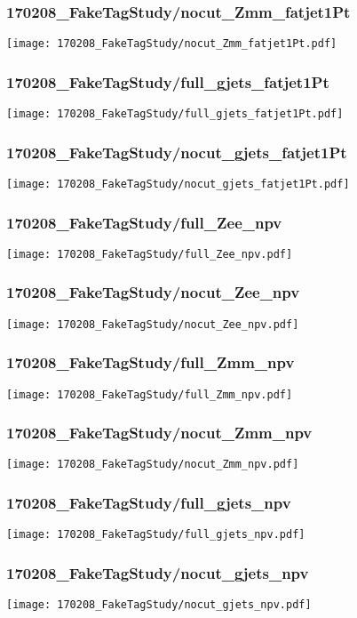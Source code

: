 \begin{frame}
   \frametitle{\small 170208\_FakeTagStudy/nocut\_Zmm\_fatjet1Pt}
   \centering
   \texttt{[image: 170208\_FakeTagStudy/nocut\_Zmm\_fatjet1Pt.pdf]}
\end{frame}

\begin{frame}
   \frametitle{\small 170208\_FakeTagStudy/full\_gjets\_fatjet1Pt}
   \centering
   \texttt{[image: 170208\_FakeTagStudy/full\_gjets\_fatjet1Pt.pdf]}
\end{frame}

\begin{frame}
   \frametitle{\small 170208\_FakeTagStudy/nocut\_gjets\_fatjet1Pt}
   \centering
   \texttt{[image: 170208\_FakeTagStudy/nocut\_gjets\_fatjet1Pt.pdf]}
\end{frame}

\begin{frame}
   \frametitle{\small 170208\_FakeTagStudy/full\_Zee\_npv}
   \centering
   \texttt{[image: 170208\_FakeTagStudy/full\_Zee\_npv.pdf]}
\end{frame}

\begin{frame}
   \frametitle{\small 170208\_FakeTagStudy/nocut\_Zee\_npv}
   \centering
   \texttt{[image: 170208\_FakeTagStudy/nocut\_Zee\_npv.pdf]}
\end{frame}

\begin{frame}
   \frametitle{\small 170208\_FakeTagStudy/full\_Zmm\_npv}
   \centering
   \texttt{[image: 170208\_FakeTagStudy/full\_Zmm\_npv.pdf]}
\end{frame}

\begin{frame}
   \frametitle{\small 170208\_FakeTagStudy/nocut\_Zmm\_npv}
   \centering
   \texttt{[image: 170208\_FakeTagStudy/nocut\_Zmm\_npv.pdf]}
\end{frame}

\begin{frame}
   \frametitle{\small 170208\_FakeTagStudy/full\_gjets\_npv}
   \centering
   \texttt{[image: 170208\_FakeTagStudy/full\_gjets\_npv.pdf]}
\end{frame}

\begin{frame}
   \frametitle{\small 170208\_FakeTagStudy/nocut\_gjets\_npv}
   \centering
   \texttt{[image: 170208\_FakeTagStudy/nocut\_gjets\_npv.pdf]}
\end{frame}

